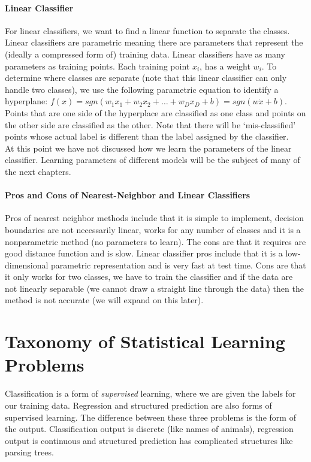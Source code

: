 \paragraph{Linear Classifier}
For linear classifiers, we want to find a linear function to separate the classes. Linear classifiers are parametric meaning there are parameters that represent the (ideally a compressed form of) training data. Linear classifiers have as many parameters as training points. Each training point $x_i$, has a weight $w_i$. To determine where classes are separate (note that this linear classifier can only handle two classes), we use the following parametric equation to identify a hyperplane:
$f(x) = sgn(w_1x_1 + w_2x_2 + \dots + w_Dx_D +b) = sgn(w \dot x +b)$. Points that are one side of the hyperplace are classified as one class and points on the other side are classified as the other. Note that there will be `mis-classified' points whose actual label is different than the label assigned by the classifier. \\

At this point we have not discussed how we learn the parameters of the linear classifier. Learning parameters of different models will be the subject of many of the next chapters. 

\paragraph{Pros and Cons of Nearest-Neighbor and Linear Classifiers}
Pros of nearest neighbor methods include that it is simple to implement, decision boundaries are not necessarily linear, works for any number of classes and it is a nonparametric method (no parameters to learn). The cons are that it requires are good distance function and is slow. Linear classifier pros include that it is a low-dimensional parametric representation and is very fast at test time. Cons are that it only works for two classes, we have to train the classifier and if the data are not linearly separable (we cannot draw a straight line through the data) then the method is not accurate (we will expand on this later).

\section{Taxonomy of Statistical Learning Problems}
Classification is a form of \textit{supervised} learning, where we are given the labels for our training data. Regression and structured prediction are also forms of supervised learning. The difference between these three problems is the form of the output. Classification output is discrete (like names of animals), regression output is continuous and structured prediction has complicated structures like parsing trees. 
